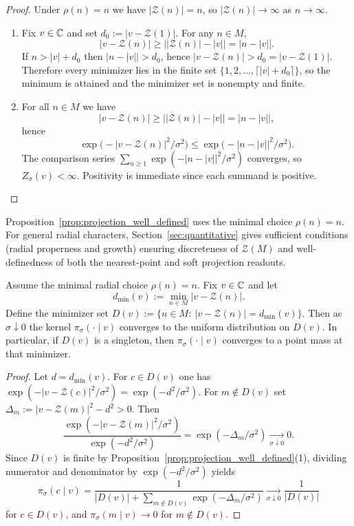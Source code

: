 \begin{proof}
Under $\rho(n)=n$ we have $|\mathcal{Z}(n)|=n$, so $|\mathcal{Z}(n)|\to\infty$ as $n\to\infty$.
\begin{enumerate}
    \item Fix $v\in\mathbb{C}$ and set $d_0:=|v-\mathcal{Z}(1)|$. For any $n\in M$,
    $$
    |v-\mathcal{Z}(n)|\ge \bigl||\mathcal{Z}(n)|-|v|\bigr|=|n-|v||.
    $$
    If $n>|v|+d_0$ then $|n-|v||>d_0$, hence $|v-\mathcal{Z}(n)|>d_0=|v-\mathcal{Z}(1)|$. Therefore every minimizer lies in the finite set $\{1,2,\dots,\lceil |v|+d_0\rceil\}$, so the minimum is attained and the minimizer set is nonempty and finite.
    \item For all $n\in M$ we have
    $$
    |v-\mathcal{Z}(n)|\ge \bigl||\mathcal{Z}(n)|-|v|\bigr|=|n-|v||,
    $$
    hence
    $$
    \exp\!\bigl(-|v-\mathcal{Z}(n)|^2/\sigma^2\bigr)\le \exp\!\bigl(-|n-|v||^2/\sigma^2\bigr).
    $$
    The comparison series $\sum_{n\ge 1}\exp(-|n-|v||^2/\sigma^2)$ converges, so $Z_\sigma(v)<\infty$. Positivity is immediate since each summand is positive.
\end{enumerate}
\end{proof}

\begin{remark}
Proposition~\ref{prop:projection_well_defined} uses the minimal choice $\rho(n)=n$.
For general radial characters, Section~\ref{sec:quantitative} gives sufficient conditions (radial properness and growth) ensuring discreteness of $\mathcal{Z}(M)$ and well-definedness of both the nearest-point and soft projection readouts.
\end{remark}

\begin{proposition}
\label{prop:sharp_projection_limit}
Assume the minimal radial choice $\rho(n)=n$. Fix $v\in\mathbb{C}$ and let
$$
d_{\min}(v):=\min_{n\in M}|v-\mathcal{Z}(n)|.
$$
Define the minimizer set $D(v):=\{n\in M:\ |v-\mathcal{Z}(n)|=d_{\min}(v)\}$.
Then as $\sigma\downarrow 0$ the kernel $\pi_\sigma(\cdot\mid v)$ converges to the uniform distribution on $D(v)$.
In particular, if $D(v)$ is a singleton, then $\pi_\sigma(\cdot\mid v)$ converges to a point mass at that minimizer.
\end{proposition}

\begin{proof}
Let $d=d_{\min}(v)$. For $c\in D(v)$ one has $\exp(-|v-\mathcal{Z}(c)|^2/\sigma^2)=\exp(-d^2/\sigma^2)$.
For $m\notin D(v)$ set $\Delta_m:=|v-\mathcal{Z}(m)|^2-d^2>0$. Then
$$
\frac{\exp(-|v-\mathcal{Z}(m)|^2/\sigma^2)}{\exp(-d^2/\sigma^2)}
=\exp(-\Delta_m/\sigma^2)\xrightarrow[\sigma\downarrow 0]{}0.
$$
Since $D(v)$ is finite by Proposition~\ref{prop:projection_well_defined}(1), dividing numerator and denominator by $\exp(-d^2/\sigma^2)$ yields
$$
\pi_\sigma(c\mid v)
=
\frac{1}{|D(v)|+\sum_{m\notin D(v)}\exp(-\Delta_m/\sigma^2)}\xrightarrow[\sigma\downarrow 0]{}\frac{1}{|D(v)|}
$$
for $c\in D(v)$, and $\pi_\sigma(m\mid v)\to 0$ for $m\notin D(v)$.
\end{proof}


